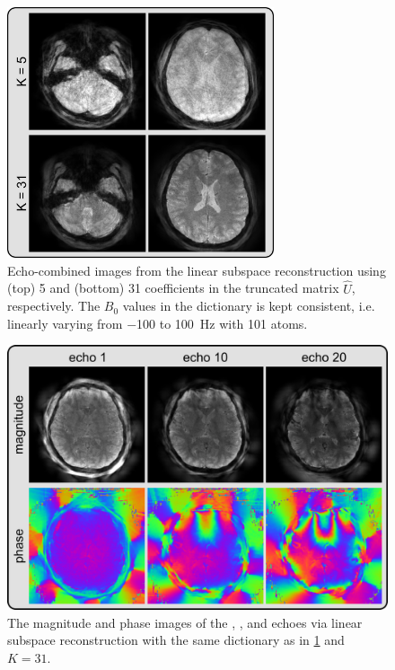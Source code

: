 \documentclass[a4paper,11pt]{article}
\def\InternRev{}
\begin{document}
\ifdefined\InternRev
\pagebreak
\fi

\begin{figure}[H]
	\centering
	\ifdefined\InternRev
	\includegraphics[width=0.7\textwidth]{../figures/fig4.png}
	\fi
	\caption{Echo-combined images from the linear subspace reconstruction
		using (top) 5 and (bottom) 31 coefficients
		in the truncated matrix $\hat{U}$, respectively.
		The $B_0$ values in the dictionary is kept consistent,
		i.e. linearly varying from \num{-100} to \SI{100}{\Hz} with \num{101} atoms.}
	\label{FIG:BasisSize}
\end{figure}

\ifdefined\InternRev
\pagebreak
\fi

\begin{figure}[H]
	\centering
	\ifdefined\InternRev
	\includegraphics[width=\textwidth]{../figures/fig5.png}
	\fi
	\caption{The magnitude and phase images
		of the , , and  echoes
		via linear subspace reconstruction with
		the same dictionary as in \cref{FIG:BasisSize} and $K = 31$.}
	\label{FIG:Echoes}
\end{figure}
\end{document}
